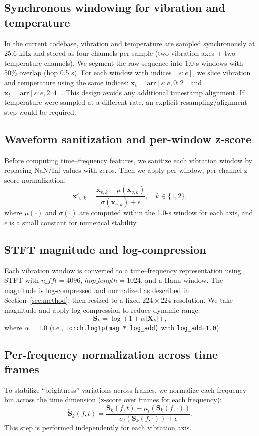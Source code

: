 \documentclass{article}
\begin{document}
\subsection{Synchronous windowing for vibration and temperature}
In the current codebase, vibration and temperature are sampled synchronously at 25.6 kHz and stored as four channels per sample (two vibration axes + two temperature channels). We segment the raw sequence into 1.0-s windows with 50\% overlap (hop 0.5 s). For each window with indices $[s:e]$, we slice vibration and temperature using the same indices:
$\mathbf{x}_v=\mathrm{arr}[s:e,0{:}2]$ and $\mathbf{x}_t=\mathrm{arr}[s:e,2{:}4]$.
This design avoids any additional timestamp alignment. If temperature were sampled at a different rate, an explicit resampling/alignment step would be required.

\subsection{Waveform sanitization and per-window z-score}
Before computing time--frequency features, we sanitize each vibration window by replacing NaN/Inf values with zeros. Then we apply per-window, per-channel z-score normalization:
\begin{equation}
\mathbf{x}'_{v,k} = \frac{\mathbf{x}_{v,k} - \mu(\mathbf{x}_{v,k})}{\sigma(\mathbf{x}_{v,k})+\epsilon},\quad k\in\{1,2\},
\end{equation}
where $\mu(\cdot)$ and $\sigma(\cdot)$ are computed within the 1.0-s window for each axis, and $\epsilon$ is a small constant for numerical stability.

\subsection{STFT magnitude and log-compression}
Each vibration window is converted to a time--frequency representation using STFT with $n\_{fft}=4096$, $hop\_length=1024$, and a Hann window. The magnitude is log-compressed and normalized as described in Section~\ref{sec:method}, then resized to a fixed $224\times224$ resolution.
We take magnitude and apply log-compression to reduce dynamic range:
\begin{equation}
\mathbf{S}_k = \log\left(1 + \alpha |\mathbf{X}_k|\right),
\end{equation}
where $\alpha=1.0$ (i.e., \texttt{torch.log1p(mag * log\_add)} with \texttt{log\_add=1.0}).

\subsection{Per-frequency normalization across time frames}
To stabilize ``brightness'' variations across frames, we normalize each frequency bin across the time dimension (z-score over frames for each frequency):
\begin{equation}
\tilde{\mathbf{S}}_k(f,t)=\frac{\mathbf{S}_k(f,t)-\mu_t(\mathbf{S}_k(f,\cdot))}{\sigma_t(\mathbf{S}_k(f,\cdot))+\epsilon}.
\end{equation}
This step is performed independently for each vibration axis.
\end{document}
